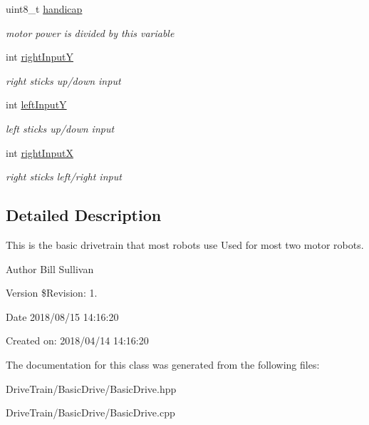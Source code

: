 \begin{DoxyCompactItemize}
\mbox{\label{class_basic_drive_controller_af011f366ab009c2567c516575926b281}} 
uint8\+\_\+t \mbox{\hyperlink{class_basic_drive_controller_af011f366ab009c2567c516575926b281}{handicap}}
\begin{DoxyCompactList}\small\item\em motor power is divided by this variable \end{DoxyCompactList}\item 
\mbox{\label{class_basic_drive_controller_a38c5c5e01542b9496643d54a6b1d489b}} 
int \mbox{\hyperlink{class_basic_drive_controller_a38c5c5e01542b9496643d54a6b1d489b}{right\+InputY}}
\begin{DoxyCompactList}\small\item\em right stick\textquotesingle{}s up/down input \end{DoxyCompactList}\item 
\mbox{\label{class_basic_drive_controller_a4506e85e8e9ae30629838b0bde6f14c6}} 
int \mbox{\hyperlink{class_basic_drive_controller_a4506e85e8e9ae30629838b0bde6f14c6}{left\+InputY}}
\begin{DoxyCompactList}\small\item\em left stick\textquotesingle{}s up/down input \end{DoxyCompactList}\item 
\mbox{\label{class_basic_drive_controller_a82a214d753ed348d9cea96fa5e23fb8b}} 
int \mbox{\hyperlink{class_basic_drive_controller_a82a214d753ed348d9cea96fa5e23fb8b}{right\+InputX}}
\begin{DoxyCompactList}\small\item\em right stick\textquotesingle{}s left/right input \end{DoxyCompactList}\end{DoxyCompactItemize}


\subsection{Detailed Description}
This is the basic drivetrain that most robots use Used for most two motor robots. 

\begin{DoxyAuthor}{Author}
Bill Sullivan
\end{DoxyAuthor}
\begin{DoxyVersion}{Version}
\$\+Revision\+: 1.
\end{DoxyVersion}
\begin{DoxyDate}{Date}
2018/08/15 14\+:16\+:20
\end{DoxyDate}
Created on\+: 2018/04/14 14\+:16\+:20 

The documentation for this class was generated from the following files\+:\begin{DoxyCompactItemize}
\item 
Drive\+Train/\+Basic\+Drive/Basic\+Drive.\+hpp\item 
Drive\+Train/\+Basic\+Drive/Basic\+Drive.\+cpp\end{DoxyCompactItemize}
